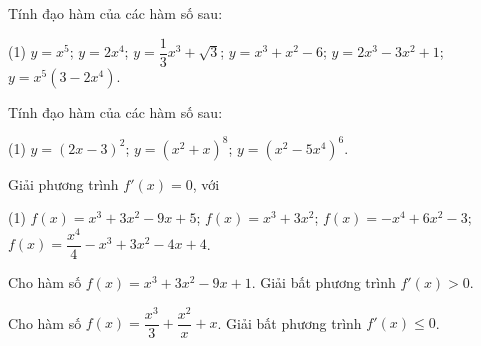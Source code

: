 \begin{vd}
	Tính đạo hàm của các hàm số sau:
	\begin{tasks}(1)
		\task $y=x^5$;
		\task $y=2x^4$;
		\task $y=\dfrac{1}{3}x^3+\sqrt{3}$;
		\task $y=x^3+x^2-6$;
		\task $y=2x^3-3x^2+1$;
		\task $y=x^5(3-2x^4)$.
	\end{tasks}
\end{vd} 

\begin{vd}
	Tính đạo hàm của các hàm số sau:
	\begin{tasks}(1)
		\task $y=(2x-3)^2$;
		\task $y=(x^2+x)^8$;
		\task $y=(x^2-5x^4)^6$.
	\end{tasks}
\end{vd} 

\begin{vd}
	Giải phương trình $f'(x)=0$, với
	\begin{tasks}(1)
		\task $f(x)=x^3+3x^2-9x+5$;
		\task $f(x)=x^3+3x^2$;
		\task $f(x)=-x^4+6x^2-3$;
		\task $f(x)=\dfrac{x^4}{4}-x^3+3x^2-4x+4$.
	\end{tasks}
\loigiai{
	\begin{enumerate}[a)]
		\item
		\item
		\item
		\item
\end{enumerate}}
\end{vd} 

\begin{vd}
	Cho hàm số $f(x)=x^{3}+3x^{2}-9x+1$. Giải bất phương trình $f'(x)>0$.
\end{vd} 

\begin{vd}
	Cho hàm số $ f(x) = \dfrac{x^3}{3} + \dfrac{x^2}{x} +x $. Giải bất phương trình $ f'(x) \le 0 $.
\end{vd} 

